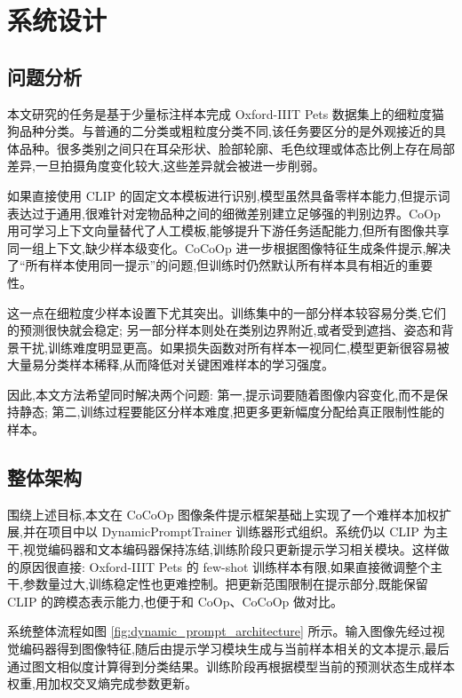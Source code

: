 \chapter{系统设计}

\section{问题分析}

本文研究的任务是基于少量标注样本完成 Oxford-IIIT Pets 数据集上的细粒度猫狗品种分类。与普通的二分类或粗粒度分类不同,该任务要区分的是外观接近的具体品种。很多类别之间只在耳朵形状、脸部轮廓、毛色纹理或体态比例上存在局部差异,一旦拍摄角度变化较大,这些差异就会被进一步削弱。

如果直接使用 CLIP 的固定文本模板进行识别,模型虽然具备零样本能力,但提示词表达过于通用,很难针对宠物品种之间的细微差别建立足够强的判别边界。CoOp 用可学习上下文向量替代了人工模板,能够提升下游任务适配能力,但所有图像共享同一组上下文,缺少样本级变化。CoCoOp 进一步根据图像特征生成条件提示,解决了“所有样本使用同一提示”的问题,但训练时仍然默认所有样本具有相近的重要性。

这一点在细粒度少样本设置下尤其突出。训练集中的一部分样本较容易分类,它们的预测很快就会稳定; 另一部分样本则处在类别边界附近,或者受到遮挡、姿态和背景干扰,训练难度明显更高。如果损失函数对所有样本一视同仁,模型更新很容易被大量易分类样本稀释,从而降低对关键困难样本的学习强度。

因此,本文方法希望同时解决两个问题: 第一,提示词要随着图像内容变化,而不是保持静态; 第二,训练过程要能区分样本难度,把更多更新幅度分配给真正限制性能的样本。

\section{整体架构}

围绕上述目标,本文在 CoCoOp 图像条件提示框架基础上实现了一个难样本加权扩展,并在项目中以 DynamicPromptTrainer 训练器形式组织。系统仍以 CLIP 为主干,视觉编码器和文本编码器保持冻结,训练阶段只更新提示学习相关模块。这样做的原因很直接: Oxford-IIIT Pets 的 few-shot 训练样本有限,如果直接微调整个主干,参数量过大,训练稳定性也更难控制。把更新范围限制在提示部分,既能保留 CLIP 的跨模态表示能力,也便于和 CoOp、CoCoOp 做对比。

系统整体流程如图 \ref{fig:dynamic_prompt_architecture} 所示。输入图像先经过视觉编码器得到图像特征,随后由提示学习模块生成与当前样本相关的文本提示,最后通过图文相似度计算得到分类结果。训练阶段再根据模型当前的预测状态生成样本权重,用加权交叉熵完成参数更新。


